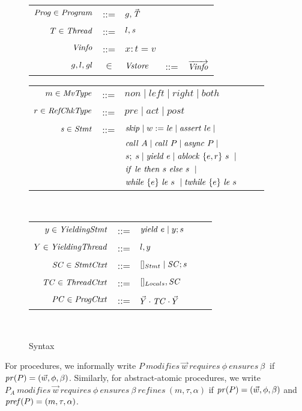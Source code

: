 \begin{figure}
\begin{tabular}{rclcl}
\end{tabular}
\begin{tabular}{rclcl}
$\mathit{Prog} \in \mathit{Program}$ & ::= & $g, \vec{\mathit{T}}$ \\
$T \in \mathit{Thread}$ & ::=  & $l, \mathit{s}$ \\
$\mathit{Vinfo}$ & ::= & $x:t=v$ \\
$g,l,\mathit{gl}$ & $\in$ & $\mathit{Vstore}$ & ::= & $\overrightarrow{\mathit{Vinfo}}$ \\
\end{tabular}
\begin{tabular}{rclcl}
$m \in \mathit{MvType}$ &::= &$\mathit{non} \mid \mathit{left} \mid \mathit{right} \mid \mathit{both}$ \\
$r \in \mathit{RefChkType}$ &::= &$\mathit{pre} \mid \mathit{act} \mid \mathit{post} $ \\
$\mathit{s} \in \mathit{Stmt}$ &::= & $\mathit{skip} \mid w := \mathit{le} \mid
\mathit{assert}\ le \mid $ \\
                  & & $\mathit{call}\ A \mid \mathit{call}\ P \mid \mathit{async}\ P \mid $\\
                  & & $s;\;s \mid \mathit{yield}\ e \mid \mathit{ablock}\ {\{e,r\}}\ {s}\  \mid$\\
                 & & ${\mathit{if}\ {\mathit{le}}\ }{\mathit{then}\ {s}\ }{\mathit{else}\ {s}\ } \mid$ \\
                  & & $\mathit{while}\ \{{e}\}\ {{\mathit{le}}\ } {{s}\ } \mid \mathit{twhile}\ \{{e}\}\ {{\mathit{le}}\ } {{s}\ }$
                  \\ 
\end{tabular}\\
\begin{tabular}{rclcl}
$y \in \mathit{YieldingStmt}$ &::= &$\mathit{yield}\ e \mid y;s$ \\
$Y \in \mathit{YieldingThread}$ &::= &$l, y$ \\
$\mathit{SC} \in \mathit{StmtCtxt}$ &::= &$[]_{Stmt} \mid \mathit{SC};s$ \\
$\mathit{TC} \in \mathit{ThreadCtxt}$ &::= &$[]_{Locals}, \mathit{SC}$ \\
$\mathit{PC} \in \mathit{ProgCtxt}$ &::= &$\vec{Y} \cdot \mathit{TC} \cdot \vec{Y}$ \\
\end{tabular}\\
\setlength{\tabcolsep}{6pt}
\caption{Syntax}
\label{fig:syntax}
\end{figure}

For procedures, we informally write $P\ \mathit{modifies}\
\vec{w}\ \mathit{requires}\ \phi\ \mathit{ensures}\ \beta\ $
if $\mathit{pr}(P) = (\vec{w}, \phi, \beta)$. Similarly, for
abstract-atomic procedures, we write $P_{A}\ \mathit{modifies}\
\vec{w}\ \mathit{requires}\ \phi\ \mathit{ensures}\ \beta\
\mathit{refines}\ (m, \tau, \alpha)$ if $\mathit{pr}(P) =
(\vec{w}, \phi, \beta)$ and $\mathit{pref}(P) = (m, \tau,
\alpha)$. 


